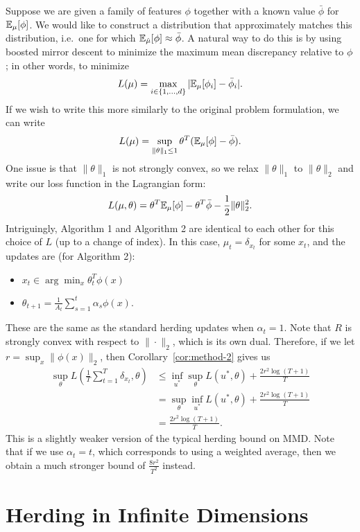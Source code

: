 \documentclass{article}
\begin{document}
Suppose we are given a family of features $\phi$ together 
with a known value $\bar{\phi}$ for $\mathbb{E}_{\mu}[\phi]$. We 
would like to construct a distribution that approximately 
matches this distribution, i.e.~one for which 
$\mathbb{E}_{\hat{\mu}}[\phi] \approx \bar{\phi}$. A natural way 
to do this is by using boosted mirror descent to minimize the 
maximum mean discrepancy relative to $\phi$; 
in other words, to minimize
\[ L(\mu) = \max_{i \in \{1,\dots,d\}} |\mathbb{E}_{\mu}[\phi_i]-\bar{\phi}_i|. \]
If we wish to write this more similarly to the original problem 
formulation, we can write
\[ L(\mu) = \sup_{\|\theta\|_1 \leq 1} \theta^T(\mathbb{E}_{\mu}[\phi]-\bar{\phi}). \]
One issue is that $\|\theta\|_1$ is not strongly convex, so we relax $\|\theta\|_1$ 
to $\|\theta\|_2$ and write our loss function in the Lagrangian form:
\[ L(\mu, \theta) = \theta^T\mathbb{E}_{\mu}[\phi] - \theta^T\bar{\phi} - \frac{1}{2}\|\theta\|_2^2. \]
Intriguingly, Algorithm 1 and Algorithm 2 are identical to each other for this choice of $L$ 
(up to a change of index). In this case, $\mu_t = \delta_{x_t}$ for some $x_t$, and 
the updates are (for Algorithm 2):
\begin{itemize}
\item $x_t \in \arg\min_{x} \theta_t^T\phi(x)$
\item $\theta_{t+1} = \frac{1}{A_t} \sum_{s=1}^t \alpha_s \phi(x)$.
\end{itemize}
These are the same as the standard herding updates when 
$\alpha_t = 1$. Note that $R$ is strongly convex with respect to 
$\|\cdot\|_2$, which is its own dual. Therefore, if we let
$r = \sup_{x} \|\phi(x)\|_2$, then Corollary~\ref{cor:method-2} gives us
\begin{align*}
\sup_{\theta} L\left(\frac{1}{T} \sum_{t=1}^T \delta_{x_t}, \theta\right) &\leq \inf_{u^*} \sup_{\theta} L(u^*, \theta) + \frac{2r^2\log(T+1)}{T} \\
 &= \sup_{\theta} \inf_{u^*} L(u^*, \theta) + \frac{2r^2\log(T+1)}{T} \\
 &= \frac{2r^2\log(T+1)}{T}.
\end{align*}
This is a slightly weaker version of the typical herding bound on MMD.
Note that if we use $\alpha_t = t$, which corresponds to using a weighted 
average, then we obtain a much stronger bound of $\frac{8r^2}{T^2}$ instead.

\section{Herding in Infinite Dimensions}
\label{sec:infinite-case}
\end{document}
